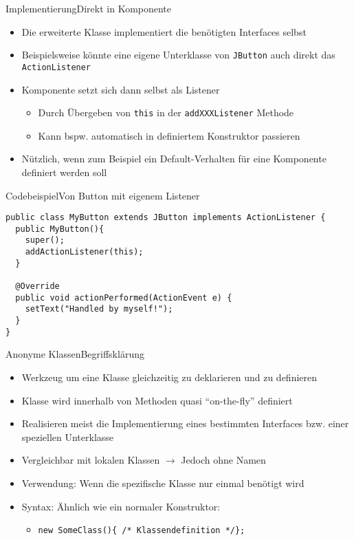 \begin{frame}{Implementierung}{Direkt in Komponente}
    \begin{itemize}
        \item Die erweiterte Klasse implementiert die benötigten Interfaces selbst
        \item Beispielsweise könnte eine eigene Unterklasse von \texttt{JButton} auch direkt das \texttt{ActionListener}
        \item Komponente setzt sich dann selbst als Listener
        \begin{itemize}
            \item Durch Übergeben von \texttt{this} in der \texttt{addXXXListener} Methode
            \item Kann bspw. automatisch in definiertem Konstruktor passieren
        \end{itemize}
        \item Nützlich, wenn zum Beispiel ein Default-Verhalten für eine Komponente definiert werden soll
    \end{itemize}
\end{frame}

\begin{frame}[fragile]{Codebeispiel}{Von Button mit eigenem Listener}
\lstset{style=java}
\begin{lstlisting}
public class MyButton extends JButton implements ActionListener {
  public MyButton(){
    super();
    addActionListener(this);
  }
  
  @Override
  public void actionPerformed(ActionEvent e) {
    setText("Handled by myself!");
  }
}
\end{lstlisting}
\end{frame}

\begin{frame}{Anonyme Klassen}{Begriffsklärung}
    \begin{itemize}
        \item Werkzeug um eine Klasse gleichzeitig zu deklarieren und zu definieren
        \item Klasse wird innerhalb von Methoden quasi "`on-the-fly"' definiert
        \item Realisieren meist die Implementierung eines bestimmten Interfaces bzw. einer speziellen Unterklasse
        \item Vergleichbar mit lokalen Klassen $\rightarrow$ Jedoch ohne Namen
        \item Verwendung: Wenn die spezifische Klasse nur einmal benötigt wird
        \item Syntax: Ähnlich wie ein normaler Konstruktor:
        \begin{itemize}
            \item \texttt{new SomeClass()\{ /* Klassendefinition */\};}
        \end{itemize}
    \end{itemize}
\end{frame}

